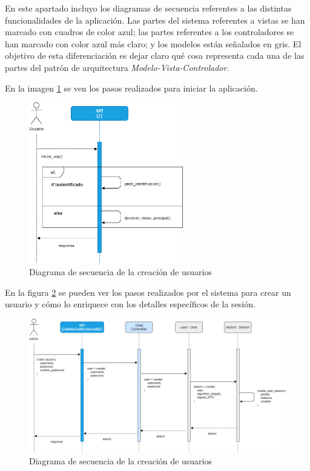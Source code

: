 En este apartado incluyo los diagramas de secuencia referentes a las distintas funcionalidades de la aplicación. Las partes del sistema referentes a vistas se han marcado con cuadros de color azul; las partes referentes a los controladores se han marcado con color azul más claro; y los modelos están señalados en gris. El objetivo de esta diferenciación es dejar claro qué cosa representa cada una de las partes del patrón de arquitectura \textit{Modelo-Vista-Controlador}. \newline

En la imagen \ref{iniciar_app} se ven los pasos realizados para iniciar la aplicación. \newline

\begin{figure}[h] 
	\includegraphics[width=0.6\textwidth]{imagenes/diagramas_secuencia/iniciar_app.png}
	\caption{Diagrama de secuencia de la creación de usuarios} \label{iniciar_app}
\end{figure}

En la figura \ref{secuencia_crear_usuario} se pueden ver los pasos realizados por el sistema para crear un usuario y cómo lo enriquece con los detalles específicos de la sesión. \newline

\begin{figure}[h] 
	\includegraphics[width=1.3\textwidth]{imagenes/diagramas_secuencia/gestion_usuarios.png}
	\caption{Diagrama de secuencia de la creación de usuarios} \label{secuencia_crear_usuario}
\end{figure}

